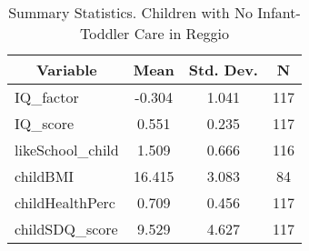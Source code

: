
\begin{table}[htbp]\centering \caption{Summary Statistics. Children with No Infant-Toddler Care in Reggio \label{bothChildasiloNoneReggio}}
\begin{tabular}{l c c  c}\hline\hline
\multicolumn{1}{c}{\textbf{Variable}} & \textbf{Mean}
 & \textbf{Std. Dev.} & \textbf{N}\\ \hline
IQ\_factor & -0.304 & 1.041  & 117\\
IQ\_score & 0.551 & 0.235  & 117\\
likeSchool\_child & 1.509 & 0.666  & 116\\
childBMI & 16.415 & 3.083  & 84\\
childHealthPerc & 0.709 & 0.456  & 117\\
childSDQ\_score & 9.529 & 4.627  & 117\\
\hline\end{tabular}
\end{table}
